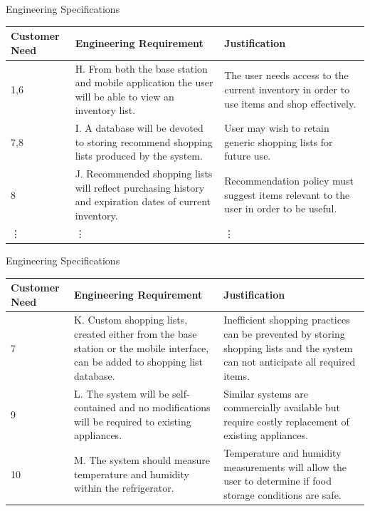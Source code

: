\documentclass[t]{beamer}
\begin{document}
\begin{frame}{Engineering Specifications}
\footnotesize
\begin{tabular}{| p{0.6in} | p{2in} |p{1.5in} |}
\hline
Customer Need & Engineering Requirement & Justification \\
\hline
1,6&H. From both the base station and mobile application the user will be able to view an inventory list.&The user needs access to the current inventory in order to use items and shop effectively.\\
\hline
7,8&I. A database will be devoted to storing recommend shopping lists produced by the system.&User may wish to retain generic shopping lists for future use.\\
\hline
8&J. Recommended shopping lists will reflect purchasing history and expiration dates of current inventory.&Recommendation policy must suggest items relevant to the user in order to be useful.\\
\hline
\vdots & \vdots & \vdots \\
\hline

\end{tabular}
\end{frame}

\begin{frame}{Engineering Specifications}
\footnotesize
\begin{tabular}{| p{0.6in} | p{2in} |p{1.5in} |}
\hline
Customer Need & Engineering Requirement & Justification \\
\hline
7&K. Custom shopping lists, created either from the base station or the mobile interface, can be added to shopping list database.&Inefficient shopping practices can be prevented by storing shopping lists and the system can not anticipate all required items.\\
\hline
9&L. The system will be self-contained and no modifications will be required to existing appliances.&Similar systems are commercially available but require costly replacement of existing appliances.\\
\hline
10&M. The system should measure temperature and humidity within the refrigerator. & Temperature and humidity measurements will allow the user to determine if food storage conditions are safe. \\
\hline
\end{tabular}
\end{frame}
\end{document}
